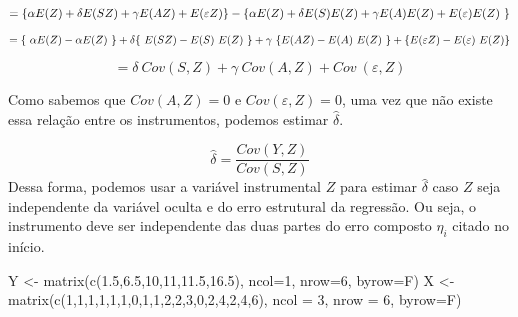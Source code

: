 \documentclass[
]{article}
\newenvironment{Shaded}{\begin{snugshade}}{\end{snugshade}}
\newcommand{\AttributeTok}[1]{\textcolor[rgb]{0.77,0.63,0.00}{#1}}
\newcommand{\DecValTok}[1]{\textcolor[rgb]{0.00,0.00,0.81}{#1}}
\newcommand{\FloatTok}[1]{\textcolor[rgb]{0.00,0.00,0.81}{#1}}
\newcommand{\FunctionTok}[1]{\textcolor[rgb]{0.00,0.00,0.00}{#1}}
\newcommand{\NormalTok}[1]{#1}
\newcommand{\OtherTok}[1]{\textcolor[rgb]{0.56,0.35,0.01}{#1}}
\begin{document}
\[ =   \{ \alpha E(Z) + \delta E(SZ) + \gamma E (AZ) + E (\varepsilon Z) \}  -\\
 \{\alpha E(Z) + \delta E(S) E(Z) + \gamma E(A) E(Z) + E(\varepsilon) E(Z) \ \} \]

\[ =   \{ \ \alpha E(Z) - \alpha E(Z) \ \} + \delta \{ \ E (SZ) - E(S) \ E(Z) \ \} + \\
\gamma \ \{  E (AZ) - E(A) \ E(Z) \ \} + \\
\{  E (\varepsilon Z) -  E(\varepsilon) \ E(Z) \}\]

\[ =   \delta \ Cov(S,Z) + \gamma \ Cov(A, Z) + Cov \ (\varepsilon, Z)\]

Como sabemos que \(Cov(A,Z) = 0\) e \(Cov(\varepsilon, Z) = 0\), uma vez
que não existe essa relação entre os instrumentos, podemos estimar
\(\hat{\delta}\).

\[ \hat{\delta} = \frac{Cov(Y,Z)}{Cov(S,Z)} \] Dessa forma, podemos usar
a variável instrumental \(Z\) para estimar \(\hat{\delta}\) caso \(Z\)
seja independente da variável oculta e do erro estrutural da regressão.
Ou seja, o instrumento deve ser independente das duas partes do erro
composto \(\eta_i\) citado no início.

\begin{Shaded}
\begin{Highlighting}[]
\NormalTok{Y }\OtherTok{\textless{}{-}} \FunctionTok{matrix}\NormalTok{(}\FunctionTok{c}\NormalTok{(}\FloatTok{1.5}\NormalTok{,}\FloatTok{6.5}\NormalTok{,}\DecValTok{10}\NormalTok{,}\DecValTok{11}\NormalTok{,}\FloatTok{11.5}\NormalTok{,}\FloatTok{16.5}\NormalTok{), }\AttributeTok{ncol=}\DecValTok{1}\NormalTok{, }\AttributeTok{nrow=}\DecValTok{6}\NormalTok{, }\AttributeTok{byrow=}\NormalTok{F)}
\NormalTok{X }\OtherTok{\textless{}{-}} \FunctionTok{matrix}\NormalTok{(}\FunctionTok{c}\NormalTok{(}\DecValTok{1}\NormalTok{,}\DecValTok{1}\NormalTok{,}\DecValTok{1}\NormalTok{,}\DecValTok{1}\NormalTok{,}\DecValTok{1}\NormalTok{,}\DecValTok{1}\NormalTok{,}\DecValTok{0}\NormalTok{,}\DecValTok{1}\NormalTok{,}\DecValTok{1}\NormalTok{,}\DecValTok{2}\NormalTok{,}\DecValTok{2}\NormalTok{,}\DecValTok{3}\NormalTok{,}\DecValTok{0}\NormalTok{,}\DecValTok{2}\NormalTok{,}\DecValTok{4}\NormalTok{,}\DecValTok{2}\NormalTok{,}\DecValTok{4}\NormalTok{,}\DecValTok{6}\NormalTok{), }\AttributeTok{ncol =} \DecValTok{3}\NormalTok{, }\AttributeTok{nrow =} \DecValTok{6}\NormalTok{, }\AttributeTok{byrow=}\NormalTok{F)}
\end{Highlighting}
\end{Shaded}
\end{document}
